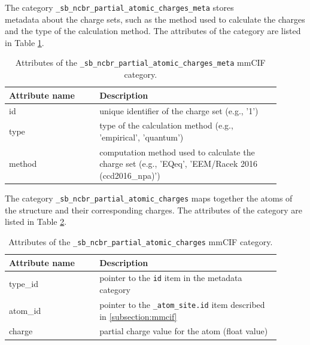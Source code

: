 \documentclass[
  digital,     %
  oneside,     %
  nosansbold,  %
  nocolorbold, %
  lof,         %
  lot,         %
]{fithesis4}
\begin{document}
The category \texttt{\_sb\_ncbr\_partial\_atomic\_charges\_meta} stores \\ metadata about the charge sets, such as the method used to calculate the charges and the type of the calculation method. The attributes of the category are listed in Table \ref{table:partial_atomic_charges_meta}.

\begin{table}[htbp]
  \centering
  \begin{tabular}{|p{0.3\linewidth} | p{0.6\linewidth}|}
    \hline
    \textbf{Attribute name} & \textbf{Description} \\
    \hline
    id & unique identifier of the charge set (e.g., '1') \\
    \hline
    type & type of the calculation method (e.g., 'empirical', 'quantum') \\
    \hline
    method & computation method used to calculate the charge set (e.g., 'EQeq', 'EEM/Racek 2016 (ccd2016\_npa)') \\
    \hline
  \end{tabular}
  \caption[Custom charge set metadata category.]{Attributes of the \texttt{\_sb\_ncbr\_partial\_atomic\_charges\_meta} mmCIF category.}
  \label{table:partial_atomic_charges_meta}
\end{table}

The category \texttt{\_sb\_ncbr\_partial\_atomic\_charges} maps together the atoms of the structure and their corresponding charges. The attributes of the category are listed in Table \ref{table:partial_atomic_charges}.

\begin{table}[htbp]
  \centering
  \begin{tabular}{|p{0.3\linewidth} | p{0.6\linewidth}|}
    \hline
    \textbf{Attribute name} & \textbf{Description} \\
    \hline
    type\_id & pointer to the \texttt{id} item in the metadata category \\
    \hline
    atom\_id & pointer to the \texttt{\_atom\_site.id} item described in \ref{subsection:mmcif} \\
    \hline
    charge & partial charge value for the atom (float value) \\
    \hline
  \end{tabular}
  \caption[Custom charge category.]{Attributes of the \texttt{\_sb\_ncbr\_partial\_atomic\_charges} mmCIF category.}
  \label{table:partial_atomic_charges}
\end{table}
\end{document}

